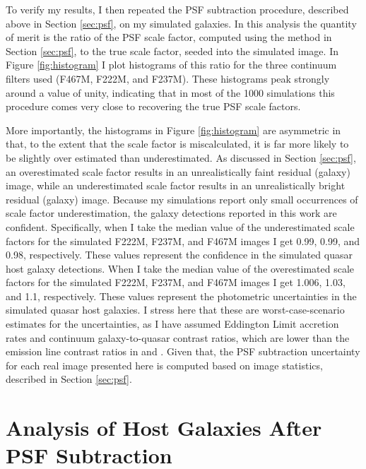 To verify my results, I then repeated the PSF subtraction procedure, described above in Section \ref{sec:psf}, on my simulated galaxies. In this analysis the quantity of merit is the ratio of the PSF scale factor, computed using the method in Section \ref{sec:psf}, to the true scale factor, seeded into the simulated image.  In Figure \ref{fig:histogram} I plot histograms of this ratio for the three continuum filters used (F467M, F222M, and F237M).  These histograms peak strongly around a value of unity, indicating that in most of the 1000 simulations this procedure comes very close to recovering the true PSF scale factors.

More importantly, the histograms in Figure \ref{fig:histogram} are asymmetric in that, to the extent that the scale factor is miscalculated, it is far more likely to be slightly over estimated than underestimated. As discussed in Section \ref{sec:psf}, an overestimated scale factor results in an unrealistically faint residual (galaxy) image, while an underestimated scale factor results in an unrealistically bright residual (galaxy) image.  Because my simulations report only small occurrences of scale factor underestimation, the galaxy detections reported in this work are confident.  Specifically, when I take the median value of the underestimated scale factors for the simulated F222M, F237M, and F467M images I get 0.99, 0.99, and 0.98, respectively. These values represent the confidence in the simulated quasar host galaxy detections. When I take the median value of the overestimated scale factors for the simulated F222M, F237M, and F467M images I get 1.006, 1.03, and 1.1, respectively. These values represent the photometric uncertainties in the simulated quasar host galaxies. I stress here that these are worst-case-scenario estimates for the uncertainties, as I have assumed Eddington Limit accretion rates and continuum galaxy-to-quasar contrast ratios, which are lower than the emission line contrast ratios in \cite{Bennert} and \cite{Bahcall}. Given that, the PSF subtraction uncertainty for each real image presented here is computed based on image statistics, described in Section \ref{sec:psf}.



\section{Analysis of Host Galaxies After PSF Subtraction}
\label{sec:analysis}

